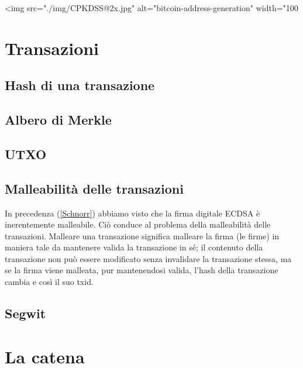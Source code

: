 \documentclass{book}
\theoremstyle{definition}
\begin{document}
<img src="./img/CPKDSS@2x.jpg" alt="bitcoin-address-generation" width="100%

\newpage
\section{Transazioni}
\subsection{Hash di una transazione}
\subsection{Albero di Merkle}
\subsection{UTXO}
\subsection{Malleabilità delle transazioni}
In precedenza (\ref{Schnorr}) abbiamo visto che la firma digitale ECDSA è inerentemente malleabile.
Ciò conduce al problema della malleabilità delle transazioni.
Malleare una transazione significa malleare la firma (le firme) in maniera tale da mantenere valida la transazione in sé;
il contenuto della transazione non può essere modificato senza invalidare la transazione stessa, ma se la firma viene malleata, 
pur mantenendosi valida, l'hash della transazione cambia e così il suo txid.
\subsection{Segwit}

\newpage
\section{La catena}

\newpage
\end{document}
